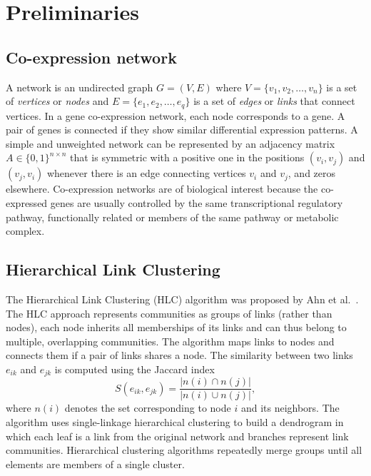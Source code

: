 \documentclass[12pt,journal, onecolumn]{IEEEtran}
\begin{document}
\section{Preliminaries}

\subsection{Co-expression network}
A network is an undirected graph $G=(V,E)$ where ${V=\{v_1,v_2,\ldots,v_{n}\}}$ is a set of \textit{vertices} or \textit{nodes} and ${E=\{e_1,e_2,\ldots,e_q\}}$ is a set of \textit{edges} or \textit{links} that connect vertices. In a gene co-expression network, each node corresponds to a gene. A pair of genes is connected if they show similar differential expression patterns. A simple and unweighted network can be represented by an adjacency matrix $A \in \{0,1\}^{n \times n}$ that is symmetric  with a positive one in the positions $(v_i,v_j)$ and $(v_j,v_i)$ whenever there is an edge connecting vertices $v_i$ and $v_j$, and zeros elsewhere. Co-expression networks are of biological interest because the co-expressed genes are usually controlled by the same transcriptional regulatory pathway, functionally related or members of the same pathway or metabolic complex.\\


\subsection{Hierarchical Link Clustering}

The Hierarchical Link Clustering (HLC) algorithm was proposed by Ahn et al.~\cite{ahn2010link}. The HLC approach represents communities as groups of links (rather than nodes), each node inherits all memberships of its links and can thus belong to multiple, overlapping communities. The algorithm maps links to nodes and connects them if a pair of links shares a node. The similarity between two links $e_{ik}$ and $e_{jk}$ is computed using the Jaccard index 
\begin{equation}
\label{eq:jaccard}
S(e_{ik},e_{jk}) = \frac{\vert n(i) \cap n(j) \vert}{\vert n(i) \cup n(j) \vert},
\end{equation}
where $n(i)$ denotes the set corresponding to node $i$ and its neighbors. The algorithm uses single-linkage hierarchical clustering to build a dendrogram in which each leaf is a link from the original network and branches represent link communities. Hierarchical clustering algorithms repeatedly merge groups until all elements are members of a single cluster.\\
\end{document}
